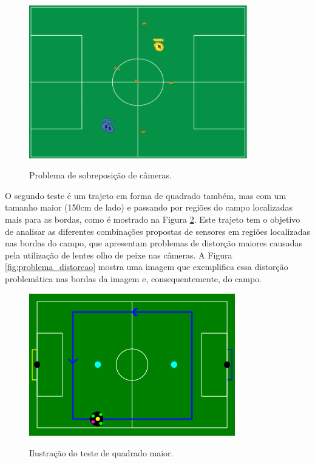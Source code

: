 \documentclass[acronym, symbols, table]{fei}
\begin{document}
		\begin{figure}[!htb]
			\centering
			\caption{Problema de sobreposição de câmeras.}
			\includegraphics[width=0.85\textwidth]{problema_overlap.png}
			\label{fig:problema_overlap}
		\end{figure}
	
		O segundo teste é um trajeto em forma de quadrado também, mas com um tamanho maior (150cm de lado) e passando por regiões do campo localizadas mais para as bordas, como é mostrado na Figura \ref{fig:representacao_teste_quadrado_maior}. Este trajeto tem o objetivo de analisar as diferentes combinações propostas de sensores em regiões localizadas nas bordas do campo, que apresentam problemas de distorção maiores causadas pela utilização de lentes olho de peixe nas câmeras. A Figura \ref{fig:problema_distorcao} mostra uma imagem que exemplifica essa distorção problemática nas bordas da imagem e, consequentemente, do campo.
			
		\begin{figure}[!htb]
			\centering
			\caption{Ilustração do teste de quadrado maior.}
			\includegraphics[width=0.80\textwidth]{representacao_teste_quadrado_maior.png}
			\label{fig:representacao_teste_quadrado_maior}
		\end{figure}
	
\end{document}
